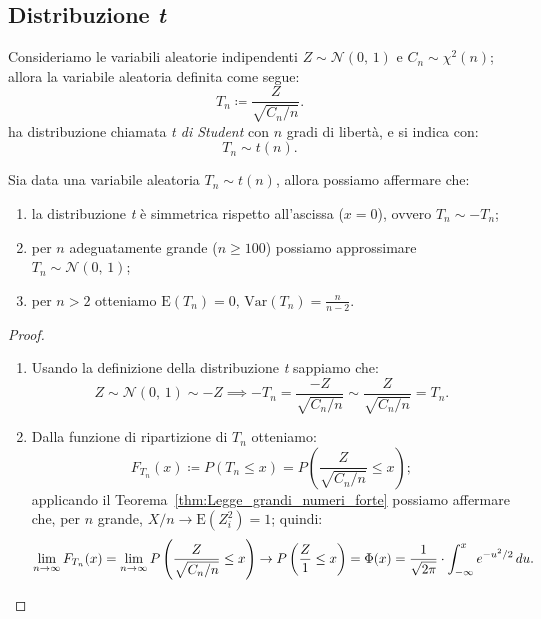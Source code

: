         \subsection{Distribuzione \textit{t}}
            \begin{defn}
                Consideriamo le variabili aleatorie indipendenti $Z \sim \mathcal{N}(0,\,1)$ e $C_n \sim \chi^2(n)$; allora la variabile aleatoria definita come segue:
                \begin{equation}\label{eq:Distribuzione_t}
                    T_n \coloneqq \frac{Z}{\sqrt{C_n /n}}
                .\end{equation}
                ha distribuzione chiamata \textit{t di Student} con $n$ gradi di libertà, e si indica con: \[
                    T_n \sim t(n)
            .\]
            \end{defn}
            \begin{prty}\label{prty:Distribuzione_t}
                Sia data una variabile aleatoria $T_n \sim t(n)$, allora possiamo affermare che:
                \begin{enumerate}
                    \item la distribuzione \textit{t} è simmetrica rispetto all'ascissa ($x=0$), ovvero $T_n \sim -T_n$;
                    \item per $n$ adeguatamente grande ($n \geq 100$) possiamo approssimare $T_n \sim \mathcal{N}(0,\,1)$;
                    \item per $n>2$ otteniamo $\text{E}(T_n)=0,\, \text{Var}(T_n)=\frac{n}{n-2}$.
                \end{enumerate}
            \end{prty}
            \begin{proof}
                \hfill
                \begin{enumerate}
                    \item Usando la definizione della distribuzione \textit{t} sappiamo che: \[
                        Z \sim \mathcal{N}(0,\,1) \sim -Z \implies
                        -T_n = \frac{-Z}{\sqrt{C_n /n}} \sim \frac{Z}{\sqrt{C_n /n}} = T_n
                    .\] 
                    \item Dalla funzione di ripartizione di $T_n$ otteniamo: \[
                            F_{T_n}(x) \coloneqq P(T_n \leq x) = P\left(\frac{Z}{\sqrt{C_n /n}} \leq x\right)
                        ;\] applicando il Teorema~\ref{thm:Legge_grandi_numeri_forte} possiamo affermare che, per $n$ grande, $X /n \rightarrow \text{E}(Z_i^2)=1$; quindi: \[
                        \lim_{n \to \infty} F_{T_n}(x) = 
                        \lim_{n \to \infty} P\left(\frac{Z}{\sqrt{C_n /n}} \leq x\right) \rightarrow
                        P\left(\frac{Z}{1} \leq x\right) = \Phi(x) = \frac{1}{\sqrt{2\pi}} \cdot \int_{-\infty}^{x} e^{-u^2 /2}\, du
                        .\qedhere\]
                \end{enumerate}
            \end{proof}
